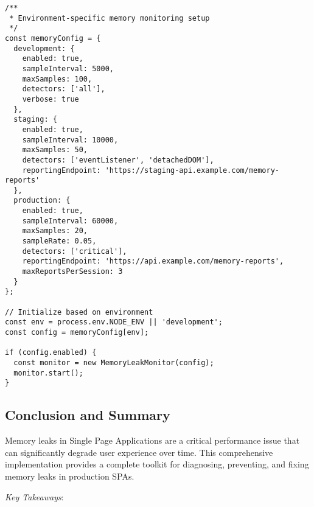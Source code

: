 \documentclass[11pt]{article}
\begin{document}
\begin{verbatim}
/**
 * Environment-specific memory monitoring setup
 */
const memoryConfig = {
  development: {
    enabled: true,
    sampleInterval: 5000,
    maxSamples: 100,
    detectors: ['all'],
    verbose: true
  },
  staging: {
    enabled: true,
    sampleInterval: 10000,
    maxSamples: 50,
    detectors: ['eventListener', 'detachedDOM'],
    reportingEndpoint: 'https://staging-api.example.com/memory-reports'
  },
  production: {
    enabled: true,
    sampleInterval: 60000,
    maxSamples: 20,
    sampleRate: 0.05,
    detectors: ['critical'],
    reportingEndpoint: 'https://api.example.com/memory-reports',
    maxReportsPerSession: 3
  }
};

// Initialize based on environment
const env = process.env.NODE_ENV || 'development';
const config = memoryConfig[env];

if (config.enabled) {
  const monitor = new MemoryLeakMonitor(config);
  monitor.start();
}
\end{verbatim}
\subsection{Conclusion and Summary}
\label{sec:orgba6bccd}

Memory leaks in Single Page Applications are a critical performance issue that can significantly degrade user experience over time. This comprehensive implementation provides a complete toolkit for diagnosing, preventing, and fixing memory leaks in production SPAs.

\emph{Key Takeaways}:
\end{document}
